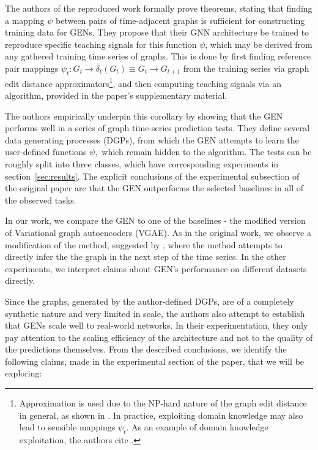 The authors of the reproduced work formally prove theorems, stating that finding a mapping $\psi$ between pairs of time-adjacent graphs is sufficient for constructing training data for GENs. 
They propose that their GNN architecture be trained to reproduce specific teaching signals for this function $\psi$, which may be derived from any gathered training time series of graphs. 
This is done by first finding reference pair mappings $\psi_{t}: G_{t} \to \bar{\delta}_{t}(G_{t}) \equiv G_{t} \to G_{t+1}$ from the training series via graph edit distance approximators\footnote{Approximation is used due to the NP-hard nature of the graph edit distance in general, as shown in \cite{bougleux2017graph}. In practice, exploiting domain knowledge may also lead to sensible mappings $\psi_{t}$. As an example of domain knowledge exploitation, the authors cite \cite{zhang1989simple}.}, and then computing teaching signals via an algorithm, provided in the paper's supplementary material. 

The authors empirically underpin this corollary by showing that the GEN performs well in a series of graph time-series prediction tests. They define several data generating processes (DGPs), from which the GEN attempts to learn the user-defined functions $\psi,$ which remain hidden to the algorithm. The tests can be roughly split into three classes, which have corresponding experiments in section~\ref{sec:results}. The explicit conclusions of the experimental subsection of the original paper are that the GEN outperforms the selected baselines in all of the observed tasks. 

In our work, we compare the GEN to one of the baselines - the modified version of Variational graph autoencoders (VGAE). As in the original work, we observe a modification of the method, suggested by \cite{VGRNN}, where the method attempts to directly infer the the graph in the next step of the time series. In the other experiments, we interpret claims about GEN's performance on different datasets directly.


Since the graphs, generated by the author-defined DGPs, are of a completely synthetic nature and very limited in scale, the authors also attempt to establish that GENs scale well to real-world networks. In their experimentation, they only pay attention to the scaling efficiency of the architecture and not to the quality of the predictions themselves. From the described conclusions, we identify the following claims, made in the experimental section of the paper, that we will be exploring:

